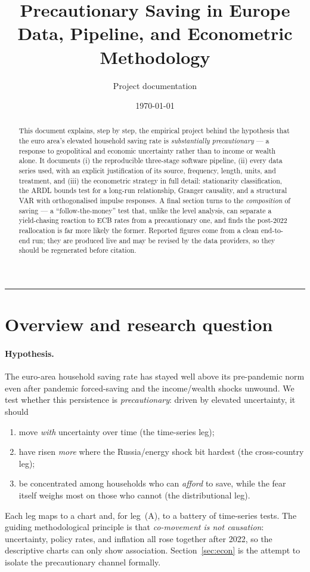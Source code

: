 \documentclass[11pt,a4paper]{article}
\title{\textbf{Precautionary Saving in Europe}\\[2pt]
       \large Data, Pipeline, and Econometric Methodology}
\author{Project documentation}
\date{\today}
\begin{document}
\maketitle
\thispagestyle{empty}

\begin{abstract}
\noindent
This document explains, step by step, the empirical project behind the
hypothesis that the euro area's elevated household saving rate is
\emph{substantially precautionary} --- a response to geopolitical and economic
uncertainty rather than to income or wealth alone. It documents (i) the
reproducible three-stage software pipeline, (ii) every data series used, with an
explicit justification of its source, frequency, length, units, and treatment,
and (iii) the econometric strategy in full detail: stationarity classification,
the ARDL bounds test for a long-run relationship, Granger causality, and a
structural VAR with orthogonalised impulse responses. A final section turns to
the \emph{composition} of saving --- a ``follow-the-money'' test that, unlike the
level analysis, can separate a yield-chasing reaction to ECB rates from a
precautionary one, and finds the post-2022 reallocation is far more likely the
former. Reported figures come from a clean end-to-end run; they are produced live
and may be revised by the data providers, so they should be regenerated before
citation.
\end{abstract}

\tableofcontents
\bigskip
\hrule
\bigskip

\section{Overview and research question}

\paragraph{Hypothesis.} The euro-area household saving rate has stayed well above
its pre-pandemic norm even after pandemic forced-saving and the income/wealth
shocks unwound. We test whether this persistence is \emph{precautionary}: driven
by elevated uncertainty, it should
\begin{enumerate}[label=(\Alph*)]
  \item move \emph{with} uncertainty over time (the time-series leg);
  \item have risen \emph{more} where the Russia/energy shock bit hardest (the
        cross-country leg);
  \item be concentrated among households who can \emph{afford} to save, while the
        fear itself weighs most on those who cannot (the distributional leg).
\end{enumerate}
Each leg maps to a chart and, for leg~(A), to a battery of time-series tests.
The guiding methodological principle is that \emph{co-movement is not
causation}: uncertainty, policy rates, and inflation all rose together after
2022, so the descriptive charts can only show association. Section~\ref{sec:econ}
is the attempt to isolate the precautionary channel formally.
\end{document}
